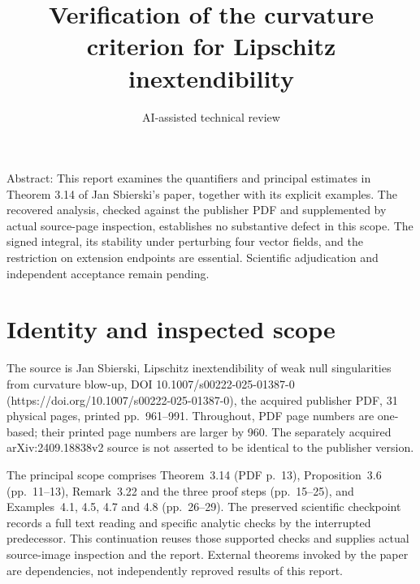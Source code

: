 \documentclass[10pt]{article}
\title{Verification of the curvature criterion for Lipschitz inextendibility}
\author{AI-assisted technical review}
\date{}
\begin{document}
\maketitle
Abstract: This report examines the quantifiers and principal estimates in Theorem 3.14 of Jan Sbierski’s paper, together with its explicit examples. The recovered analysis, checked against the publisher PDF and supplemented by actual source-page inspection, establishes no substantive defect in this scope. The signed integral, its stability under perturbing four vector fields, and the restriction on extension endpoints are essential. Scientific adjudication and independent acceptance remain pending.\par
\section*{Identity and inspected scope}
The source is Jan Sbierski, Lipschitz inextendibility of weak null singularities from curvature blow-up, DOI 10.1007/s00222-025-01387-0 (https://doi.org/10.1007/s00222-025-01387-0), the acquired publisher PDF, 31 physical pages, printed pp. 961–991. Throughout, PDF page numbers are one-based; their printed page numbers are larger by 960. The separately acquired arXiv:2409.18838v2 source is not asserted to be identical to the publisher version.\par
The principal scope comprises Theorem 3.14 (PDF p. 13), Proposition 3.6 (pp. 11–13), Remark 3.22 and the three proof steps (pp. 15–25), and Examples 4.1, 4.5, 4.7 and 4.8 (pp. 26–29). The preserved scientific checkpoint records a full text reading and specific analytic checks by the interrupted predecessor. This continuation reuses those supported checks and supplies actual source-image inspection and the report. External theorems invoked by the paper are dependencies, not independently reproved results of this report.\par
\end{document}
